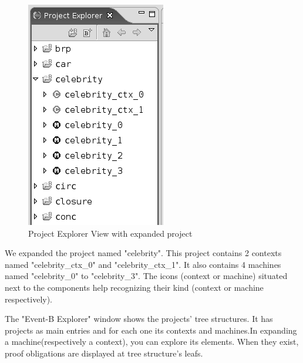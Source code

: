 \begin{figure}[!h]
\begin{center}
	\includegraphics{img/reference/ref_01_project_explorer2.png}
	\caption{Project Explorer View with expanded project}
	\label{fig_ref_01_project_explorer2}
\end{center}
\end{figure}

We expanded the project named "celebrity". This project contains 2 contexts named "celebrity\_ctx\_0" and "celebrity\_ctx\_1". It also contains 4 machines named "celebrity\_0" to "celebrity\_3". The icons (context or machine) situated next to the components help recognizing their kind (context or machine respectively).

The "Event-B Explorer" window shows the projects' tree structures. It has projects as main entries and for each one its contexts and machines.In expanding a machine(respectively a context), you can explore its elements. When they exist, proof obligations are displayed at tree structure's leafs. 

